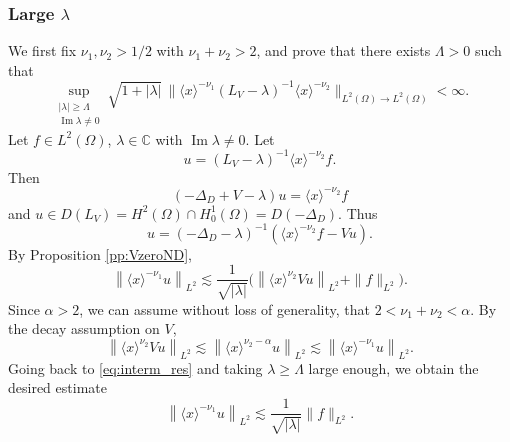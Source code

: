 \documentclass[10pt,leqno]{amsart}
\DeclareMathOperator{\im}{Im} %
\theoremstyle{definition}%
\theoremstyle{remark}
\numberwithin{equation}{section}
\newcommand{\C}{\mathbb{C}}
\renewcommand{\^}{\widehat}%
\begin{document}
\subsubsection{Large $\lambda$}
\label{sub:large}
We first fix $\nu_1,\nu_2>1/2$ with $\nu_1+\nu_2>2$, and prove that there exists $\Lambda>0$ such that 
\begin{equation}
\label{eq:large_lambda}
\sup_{\substack{|\lambda| \ge\Lambda\\ \im \lambda \neq 0}}
\sqrt{1+\lvert \lambda\rvert}\,
\bigl\lVert \langle x\rangle^{-\nu_1}(L_V-\lambda)^{-1}\langle x\rangle^{-\nu_2}\bigr\rVert_{L^2(\Omega)\to L^2(\Omega)}<\infty.
\end{equation}
Let $f\in L^2(\Omega)$, $\lambda\in \C$ with $\im \lambda\neq 0$. Let 
$$ u=\left( L_V-\lambda \right)^{-1}\langle x\rangle^{-\nu_2}f.$$
Then
$$ (-\Delta_D+V-\lambda)u= \langle x\rangle^{-\nu_2}f$$
and $u\in D(L_V)=H^2(\Omega)\cap H^1_0(\Omega)=D(-\Delta_D)$. Thus
$$ u=(-\Delta_D-\lambda)^{-1}\left( \langle x\rangle^{-\nu_2}f-V u  \right).$$
By Proposition \ref{pp:VzeroND}, 
\begin{equation}
\label{eq:interm_res}
\left\| \langle x\rangle^{-\nu_1} u\right\|_{L^2}\lesssim \frac{1}{\sqrt{|\lambda|}} \big( \left\|\langle x\rangle^{\nu_2} Vu\right\|_{L^2}+\|f\|_{L^2} \big). 
\end{equation} 
Since $\alpha>2$, we can assume without loss of generality, that $2<\nu_1+\nu_2<\alpha$. By the decay assumption on $V$, 
$$\left\| \langle x\rangle^{\nu_2} V u\right\|_{L^2}\lesssim \left\| \langle x\rangle^{\nu_2-\alpha}u\right\|_{L^2}\lesssim \left\| \langle x\rangle^{-\nu_1}u\right\|_{L^2}.$$
Going back to \eqref{eq:interm_res} and taking $\lambda\geq \Lambda$ large enough, we obtain the desired estimate
$$\left\| \langle x\rangle^{-\nu_1} u\right\|_{L^2}\lesssim \frac{1}{\sqrt{|\lambda|}} \|f\|_{L^2}.$$
\end{document}
